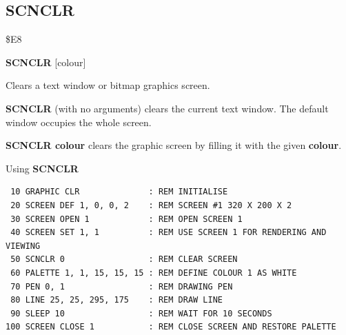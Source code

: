 
\newpage
\subsection{SCNCLR}
\begin{description}[leftmargin=2cm,style=nextline]
\item [Token:]    \$E8

\item [Format:]   {\bf SCNCLR} [colour]

\item [Usage:]    Clears a text window or bitmap graphics screen.

                  {\bf SCNCLR} (with no arguments) clears the current text window. The default window occupies the whole screen.

                  {\bf SCNCLR colour} clears the graphic screen by filling it with the given {\bf colour}.

\item [Example:]  Using {\bf SCNCLR}

\begin{tcolorbox}[colback=black,coltext=white]
\verbatimfont{\codefont}
\begin{verbatim}
 10 GRAPHIC CLR              : REM INITIALISE
 20 SCREEN DEF 1, 0, 0, 2    : REM SCREEN #1 320 X 200 X 2
 30 SCREEN OPEN 1            : REM OPEN SCREEN 1
 40 SCREEN SET 1, 1          : REM USE SCREEN 1 FOR RENDERING AND VIEWING
 50 SCNCLR 0                 : REM CLEAR SCREEN
 60 PALETTE 1, 1, 15, 15, 15 : REM DEFINE COLOUR 1 AS WHITE
 70 PEN 0, 1                 : REM DRAWING PEN
 80 LINE 25, 25, 295, 175    : REM DRAW LINE
 90 SLEEP 10                 : REM WAIT FOR 10 SECONDS
100 SCREEN CLOSE 1           : REM CLOSE SCREEN AND RESTORE PALETTE
\end{verbatim}
\end{tcolorbox}
\end{description}


\newpage
